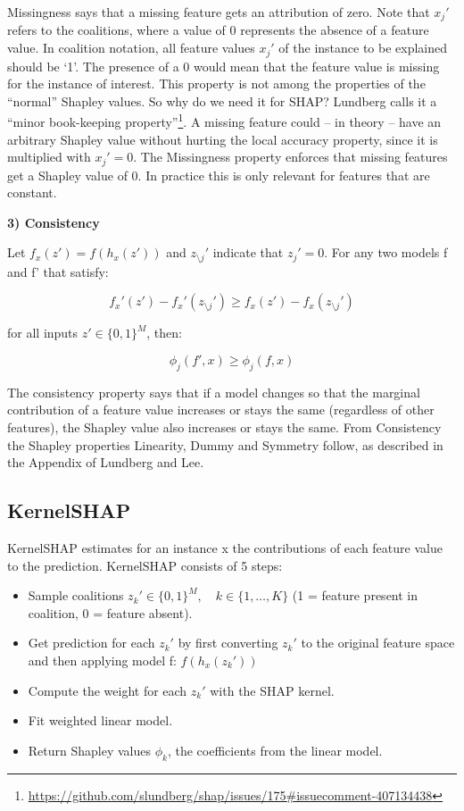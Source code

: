 \documentclass[
  12pt,
]{krantz}
\providecommand{\tightlist}{%
  \setlength{\itemsep}{0pt}\setlength{\parskip}{0pt}}
\renewcommand{\href}[2]{#2\footnote{\url{#1}}}
\begin{document}
Missingness says that a missing feature gets an attribution of zero.
Note that \(x_j'\) refers to the coalitions, where a value of 0 represents the absence of a feature value.
In coalition notation, all feature values \(x_j'\) of the instance to be explained should be `1'.
The presence of a 0 would mean that the feature value is missing for the instance of interest.
This property is not among the properties of the ``normal'' Shapley values.
So why do we need it for SHAP?
Lundberg calls it a \href{https://github.com/slundberg/shap/issues/175\#issuecomment-407134438}{``minor book-keeping property''}.
A missing feature could -- in theory -- have an arbitrary Shapley value without hurting the local accuracy property, since it is multiplied with \(x_j'=0\).
The Missingness property enforces that missing features get a Shapley value of 0.
In practice this is only relevant for features that are constant.

\textbf{3) Consistency}

Let \(f_x(z')=f(h_x(z'))\) and \(z_{\setminus{}j}'\) indicate that \(z_j'=0\).
For any two models f and f' that satisfy:

\[f_x'(z')-f_x'(z_{\setminus{}j}')\geq{}f_x(z')-f_x(z_{\setminus{}j}')\]

for all inputs \(z'\in\{0,1\}^M\), then:

\[\phi_j(f',x)\geq\phi_j(f,x)\]

The consistency property says that if a model changes so that the marginal contribution of a feature value increases or stays the same (regardless of other features), the Shapley value also increases or stays the same.
From Consistency the Shapley properties Linearity, Dummy and Symmetry follow, as described in the Appendix of Lundberg and Lee.

\hypertarget{kernelshap}{%
\subsection{KernelSHAP}\label{kernelshap}}

KernelSHAP estimates for an instance x the contributions of each feature value to the prediction.
KernelSHAP consists of 5 steps:

\begin{itemize}
\tightlist
\item
  Sample coalitions \(z_k'\in\{0,1\}^M,\quad{}k\in\{1,\ldots,K\}\) (1 = feature present in coalition, 0 = feature absent).
\item
  Get prediction for each \(z_k'\) by first converting \(z_k'\) to the original feature space and then applying model f: \(f(h_x(z_k'))\)
\item
  Compute the weight for each \(z_k'\) with the SHAP kernel.
\item
  Fit weighted linear model.
\item
  Return Shapley values \(\phi_k\), the coefficients from the linear model.
\end{itemize}
\end{document}
